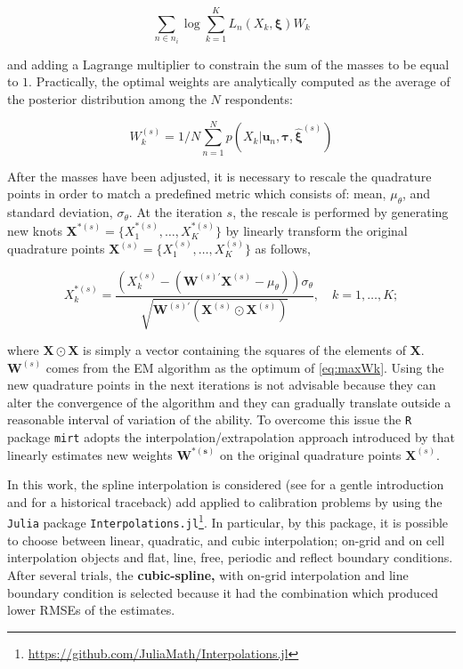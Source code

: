 \begin{equation}\label{eq:maxWk}
\sum_{n \in n_i}{\log{\sum_{k=1}^K{{\mathit{L_n}(X_k,\boldsymbol{\xi})}W_k}}} 
\end{equation} 

and adding a Lagrange multiplier to constrain the sum of the masses to be equal to $1$. 
Practically, the optimal weights are analytically computed as the average of the posterior distribution among the $N$ respondents: 

\begin{equation} \label{eq:updateWk}
W_k^{(s)}  = 1/N \sum_{n=1}^N{p(X_k|\boldsymbol{u}_n,\boldsymbol{\tau},\hat{\boldsymbol{\xi}}^{(s)})} 
\end{equation}

After the masses have been adjusted, it is necessary to rescale the quadrature points in order to match a predefined metric which consists of: mean, $\mu_\theta$, and standard deviation, $\sigma_\theta$. At the iteration $s$, the rescale is performed by generating new knots $\boldsymbol{X}^{*(s)}=\{X_1^{*(s)},\ldots,X_K^{*(s)}\}$ by linearly transform the original quadrature points $\boldsymbol{X}^{(s)}=\{X_1^{(s)},\ldots,X_K^{(s)}\}$ as follows,

\begin{equation}\label{eq:rescale}
X_k^{*(s)}=\frac{(X_k^{(s)}-(\boldsymbol{W}^{(s)'}\boldsymbol{X}^{(s)}-\mu_\theta))\sigma_\theta}{\sqrt{\boldsymbol{W}^{(s)'}(\boldsymbol{X}^{(s)}\odot \boldsymbol{X}^{(s)})}}, \quad  k=1,\ldots,K;
\end{equation}

where $\boldsymbol{X} \odot \boldsymbol{X}$ is simply a vector containing the squares of the elements of $\boldsymbol{X}$. $\boldsymbol{W}^{(s)}$ comes from the EM algorithm as the optimum of \eqref{eq:maxWk}.
Using the new quadrature points in the next iterations is not advisable because they can alter the convergence of the algorithm and they can gradually translate outside a reasonable interval of variation of the ability. To overcome this issue the \texttt{R} package \texttt{mirt} adopts the interpolation/extrapolation approach introduced by \textcite{woods2007} that linearly estimates new weights $\boldsymbol{W^{*(s)}}$ on the original quadrature points $\boldsymbol{X}^{(s)}$. 

In this work, the spline interpolation is considered (see \textcite{de1978practical} for a gentle introduction and \textcite{meijering2002chronology} for a historical traceback) add applied to calibration problems by using the \texttt{Julia} package \texttt{Interpolations.jl}\footnote{\url{https://github.com/JuliaMath/Interpolations.jl}}.
In particular, by this package, it is possible to choose between linear, quadratic, and cubic interpolation; on-grid and on cell interpolation objects and flat, line, free, periodic and reflect boundary conditions. After several trials, the \textbf{cubic-spline,} with on-grid interpolation and line boundary condition is selected because it had the combination which produced lower RMSEs of the estimates.

